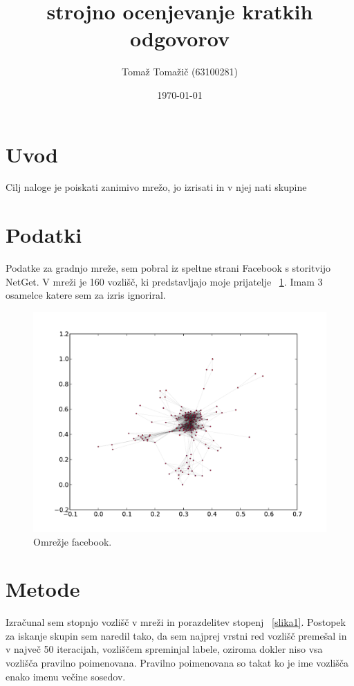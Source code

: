 \documentclass[a4paper,11pt]{article}
\title{strojno ocenjevanje kratkih odgovorov}
\author{Tomaž Tomažič (63100281)}
\date{\today}
\begin{document}
\maketitle

\section{Uvod}

Cilj naloge je poiskati zanimivo mrežo, jo izrisati in v njej nati skupine
\section{Podatki}

Podatke za gradnjo mreže, sem pobral iz speltne strani Facebook s storitvijo NetGet. V mreži je 160 vozlišč, ki predstavljajo moje prijatelje ~\ref{graf1}. Imam 3 osamelce katere sem za izris ignoriral.

\begin{figure}[htbp]
\begin{center}
\includegraphics[scale=0.3]{G.pdf}
\caption{Omrežje facebook.}
\label{graf1}
\end{center}
\end{figure}

\section{Metode}

Izračunal sem stopnjo vozlišč v mreži in porazdelitev stopenj  ~\ref{slika1}. 
Postopek za iskanje skupin sem naredil tako, da sem najprej vrstni red vozlišč premešal in v največ 50 iteracijah, vozliščem spreminjal labele, oziroma dokler niso vsa vozlišča pravilno poimenovana. Pravilno poimenovana so takat ko je ime vozlišča enako imenu večine sosedov.
\end{document}
